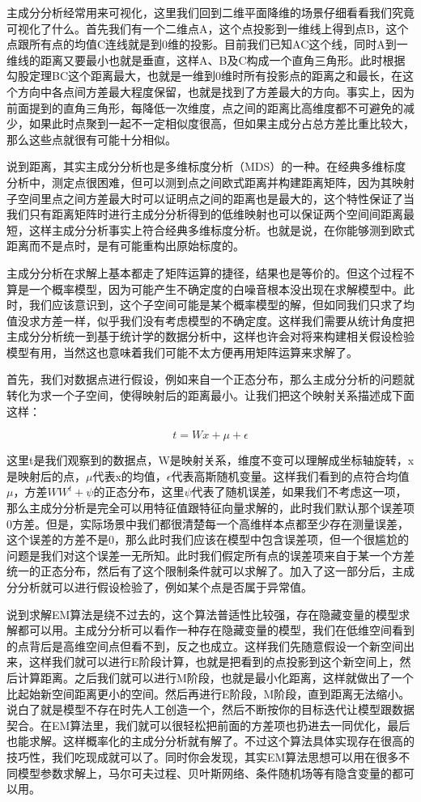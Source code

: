 \documentclass[]{tufte-book}
\begin{document}
主成分分析经常用来可视化，这里我们回到二维平面降维的场景仔细看看我们究竟可视化了什么。首先我们有一个二维点A，这个点投影到一维线上得到点B，这个点跟所有点的均值C连线就是到0维的投影。目前我们已知AC这个线，同时A到一维线的距离又要最小也就是垂直，这样A、B及C构成一个直角三角形。此时根据勾股定理BC这个距离最大，也就是一维到0维时所有投影点的距离之和最长，在这个方向中各点间方差最大程度保留，也就是找到了方差最大的方向。事实上，因为前面提到的直角三角形，每降低一次维度，点之间的距离比高维度都不可避免的减少，如果此时点聚到一起不一定相似度很高，但如果主成分占总方差比重比较大，那么这些点就很有可能十分相似。

说到距离，其实主成分分析也是多维标度分析（MDS）的一种。在经典多维标度分析中，测定点很困难，但可以测到点之间欧式距离并构建距离矩阵，因为其映射子空间里点之间方差最大时可以证明点之间的距离也是最大的，这个特性保证了当我们只有距离矩阵时进行主成分分析得到的低维映射也可以保证两个空间间距离最短，这样主成分分析事实上符合经典多维标度分析。也就是说，在你能够测到欧式距离而不是点时，是有可能重构出原始标度的。

主成分分析在求解上基本都走了矩阵运算的捷径，结果也是等价的。但这个过程不算是一个概率模型，因为可能产生不确定度的白噪音根本没出现在求解模型中。此时，我们应该意识到，这个子空间可能是某个概率模型的解，但如同我们只求了均值没求方差一样，似乎我们没有考虑模型的不确定度。这样我们需要从统计角度把主成分分析统一到基于统计学的数据分析中，这样也许会对将来构建相关假设检验模型有用，当然这也意味着我们可能不太方便再用矩阵运算来求解了。

首先，我们对数据点进行假设，例如来自一个正态分布，那么主成分分析的问题就转化为求一个子空间，使得映射后的距离最小。让我们把这个映射关系描述成下面这样：

\[
t = Wx + \mu + \epsilon
\]

这里t是我们观察到的数据点，W是映射关系，维度不变可以理解成坐标轴旋转，x是映射后的点，\(\mu\)代表x的均值，\(\epsilon\)代表高斯随机变量。这样我们看到的点符合均值\(\mu\)，方差\(WW^t + \psi\)的正态分布，这里\(\psi\)代表了随机误差，如果我们不考虑这一项，那么主成分分析是完全可以用特征值跟特征向量求解的，此时我们默认那个误差项0方差。但是，实际场景中我们都很清楚每一个高维样本点都至少存在测量误差，这个误差的方差不是0，那么此时我们应该在模型中包含误差项，但一个很尴尬的问题是我们对这个误差一无所知。此时我们假定所有点的误差项来自于某一个方差统一的正态分布，然后有了这个限制条件就可以求解了。加入了这一部分后，主成分分析就可以进行假设检验了，例如某个点是否属于异常值。

说到求解EM算法是绕不过去的，这个算法普适性比较强，存在隐藏变量的模型求解都可以用。主成分分析可以看作一种存在隐藏变量的模型，我们在低维空间看到的点背后是高维空间点但看不到，反之也成立。这样我们先随意假设一个新空间出来，这样我们就可以进行E阶段计算，也就是把看到的点投影到这个新空间上，然后计算距离。之后我们就可以进行M阶段，也就是最小化距离，这样就做出了一个比起始新空间距离更小的空间。然后再进行E阶段，M阶段，直到距离无法缩小。说白了就是模型不存在时先人工创造一个，然后不断按你的目标迭代让模型跟数据契合。在EM算法里，我们就可以很轻松把前面的方差项也扔进去一同优化，最后也能求解。这样概率化的主成分分析就有解了。不过这个算法具体实现存在很高的技巧性，我们吃现成就可以了。同时你会发现，其实EM算法思想可以用在很多不同模型参数求解上，马尔可夫过程、贝叶斯网络、条件随机场等有隐含变量的都可以用。
\end{document}
